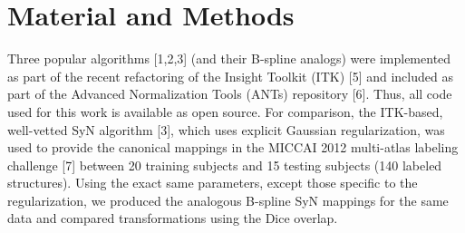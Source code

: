 \documentclass{frontiersSCNS}
\begin{document}
%
%
%


\section{Material and Methods}

Three popular algorithms [1,2,3] (and their B-spline analogs) were implemented as part of the recent refactoring of the Insight Toolkit (ITK) [5] and included as part of the Advanced Normalization Tools (ANTs) repository [6].  Thus, all code used for this work is available as open source.   For comparison, the ITK-based, well-vetted SyN algorithm [3], which uses explicit Gaussian regularization, was used to provide the canonical mappings in the MICCAI 2012 multi-atlas labeling challenge [7] between 20 training subjects and 15 testing subjects (140 labeled structures).  Using the exact same parameters, except those specific to the regularization, we produced the analogous B-spline SyN mappings for the same data and compared transformations using the Dice overlap.
\end{document}
